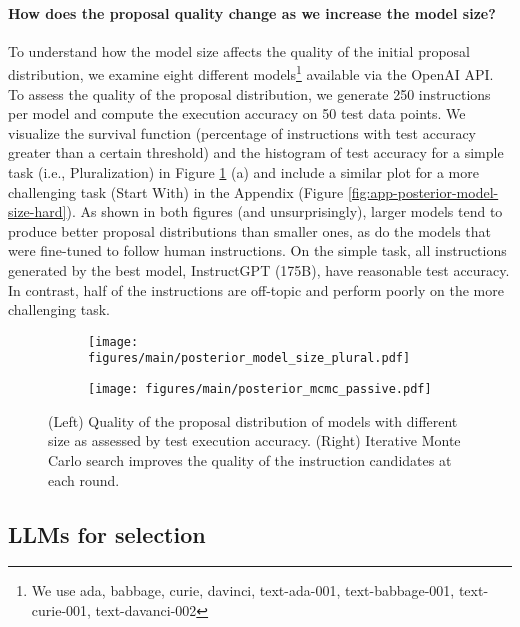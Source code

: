 \paragraph{How does the proposal quality change as we increase the model size?} To understand how the model size affects the quality of the initial proposal distribution, we examine eight different models\footnote{We use ada, babbage, curie, davinci, text-ada-001, text-babbage-001, text-curie-001, text-davanci-002} available via the OpenAI API. To assess the quality of the proposal distribution, we generate 250 instructions per model and compute the execution accuracy on 50 test data points. We visualize the survival function (percentage of instructions with test accuracy greater than a certain threshold) and the histogram of test accuracy for a simple task (i.e., Pluralization) in Figure \ref{fig:main-posterior} (a) and include a similar plot for a more challenging task (Start With) in the Appendix (Figure \ref{fig:app-posterior-model-size-hard}). As shown in both figures (and unsurprisingly), larger models tend to produce better proposal distributions than smaller ones, as do the models that were fine-tuned to follow human instructions. On the simple task, all instructions generated by the best model, InstructGPT (175B), have reasonable test accuracy. In contrast, half of the instructions are off-topic and perform poorly on the more challenging task. 

\begin{figure}
  \centering
  \vspace{-0.1in}
 \begin{subfigure}[b]{0.49\textwidth}
  \texttt{[image: figures/main/posterior\_model\_size\_plural.pdf]}
  \end{subfigure}
  \begin{subfigure}[b]{0.49\textwidth}
  \texttt{[image: figures/main/posterior\_mcmc\_passive.pdf]}
  \end{subfigure}
  \caption{(Left) Quality of the proposal distribution of models with different size as assessed by test execution accuracy. (Right) Iterative Monte Carlo search improves the quality of the instruction candidates at each round.}\label{fig:main-posterior}
\end{figure}

\subsection{LLMs for selection}
